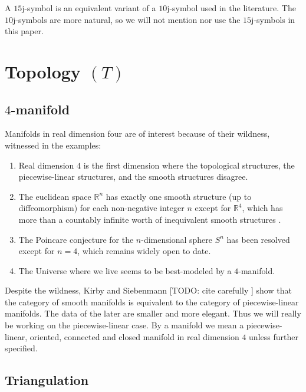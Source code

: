 \begin{remark}[$15$j-symbol]\label{remark/15j-symbol}
  A $15$j-symbol is an equivalent variant of a $10$j-symbol used
  in the literature. The $10$j-symbols are more natural, so we
  will not mention nor use the $15$j-symbols in this paper.
\end{remark}

\section{Topology $(T)$}\label{section/topology}
\subsection{$4$-manifold}

Manifolds in real dimension four are of interest because of their
wildness, witnessed in the examples:

\begin{enumerate}
  \item Real dimension $4$ is the first dimension where the
        topological structures, the piecewise-linear structures,
        and the smooth structures disagree.
  \item The euclidean space $\mathbb{R}^{n}$ has exactly one
        smooth structure (up to diffeomorphism) for each
        non-negative integer $n$ except for $\mathbb{R}^{4}$,
        which has more than a countably infinite worth of
        inequivalent smooth structures
        \cite{scorpan/the-wild-world-of-4-manifolds}.
  \item The Poincare conjecture for the $n$-dimensional sphere
        $S^{n}$ has been resolved except for $n=4$, which remains
        widely open to date.
  \item The Universe where we live seems to be best-modeled by a
        $4$-manifold.
\end{enumerate}

\noindent Despite the wildness, Kirby and Siebenmann [TODO: cite
carefully \cite{kirby-siebenmann}] show that the category of
smooth manifolds is equivalent to the category of
piecewise-linear manifolds. The data of the later are smaller and
more elegant. Thus we will really be working on the
piecewise-linear case. By a manifold we mean a piecewise-linear,
oriented, connected and closed manifold in real dimension $4$
unless further specified.

\subsection{Triangulation} \label{subsection/triangulation}

